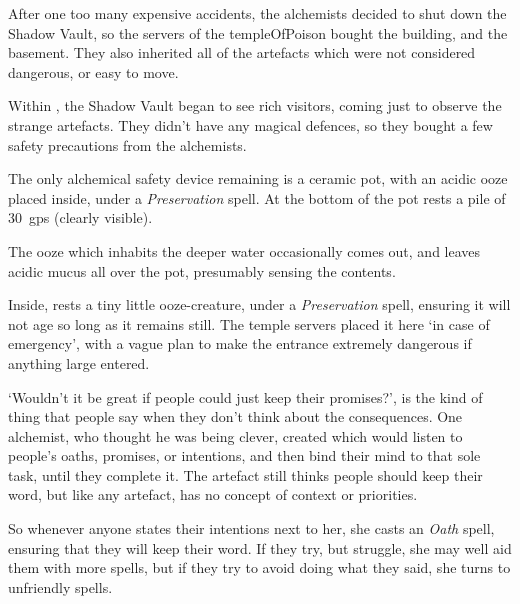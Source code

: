\begin{multicols}{2}
\showStdSpells[
  \setcounter{diceNo}{0}
]


\begin{exampletext}
  After one too many expensive accidents, the alchemists decided to shut down the Shadow Vault, so the \glspl{server} of the \gls{templeOfPoison} bought the building, and the basement.
  They also inherited all of the \glspl{artefact} which were not considered dangerous, or easy to move.

  Within , the Shadow Vault began to see rich visitors, coming just to observe the strange \glspl{artefact}.
  They didn't have any magical defences, so they bought a few safety precautions from the alchemists.
\end{exampletext}

The only alchemical safety device remaining is a ceramic pot, with an acidic ooze placed inside, under a \textit{Preservation} spell.
At the bottom of the pot rests a pile of 30~\glspl{gp} (clearly visible).

The ooze which inhabits the deeper water  occasionally comes out, and leaves acidic mucus all over the pot, presumably sensing the contents.

Inside, rests a tiny little ooze-creature, under a \textit{Preservation} spell, ensuring it will not age so long as it remains still.
The temple \glspl{server} placed it here `in case of emergency', with a vague plan to make the entrance extremely dangerous if anything large entered.



\begin{exampletext}
  `Wouldn't it be great if people could just keep their promises?', is the kind of thing that people say when they don't think about the consequences.
  One alchemist, who thought he was being clever, created  which would listen to people's oaths, promises, or intentions, and then bind their mind to that sole task, until they complete it.
  The \gls{artefact} still thinks people should keep their word, but like any \gls{artefact}, has no concept of context or priorities.

  So whenever anyone states their intentions next to her, she casts an \textit{Oath} spell, ensuring that they will keep their word.
  If they try, but struggle, she may well aid them with more spells, but if they try to avoid doing what they said, she turns to unfriendly spells.


\end{exampletext}
\end{multicols}
